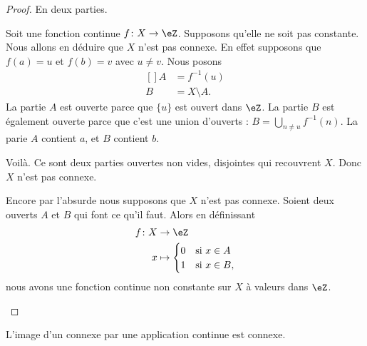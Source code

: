 \begin{proof}
	En deux parties.
	\begin{subproof}
		\spitem[\( \Rightarrow\)]
		Soit une fonction continue \(f \colon X\to \eZ  \). Supposons qu'elle ne soit pas constante. Nous allons en déduire que \( X\) n'est pas connexe. En effet supposons que \( f(a)=u\) et \( f(b)=v\) avec \( u\neq v\). Nous posons
		\begin{equation}
			\begin{aligned}[]
				A & =f^{-1}(u)     \\
				B & =X\setminus A.
			\end{aligned}
		\end{equation}
		La partie \( A\) est ouverte parce que \( \{ u \}\) est ouvert dans \( \eZ\). La partie \( B\) est également ouverte parce que c'est une union d'ouverts :  \( B=\bigcup_{n\neq u}f^{-1}(n)\). La parie \( A\) contient \( a\), et \( B\) contient \( b\).

		Voilà. Ce sont deux parties ouvertes non vides, disjointes qui recouvrent \( X\). Donc \( X\) n'est pas connexe.

		\spitem[\( \Leftarrow\)]
		Encore par l'absurde nous supposons que \( X\) n'est pas connexe. Soient deux ouverts \( A\) et \( B\) qui font ce qu'il faut. Alors en définissant
		\begin{equation}
			\begin{aligned}
				f\colon X & \to \eZ                       \\
				x         & \mapsto \begin{cases}
					                    0 & \text{si } x\in A \\
					                    1 & \text{si }x\in B,
				                    \end{cases}
			\end{aligned}
		\end{equation}
		nous avons une fonction continue non constante sur \( X\) à valeurs dans \( \eZ\).
	\end{subproof}
\end{proof}


\begin{lemma}   \label{LemConncontconn}
	L'image d'un connexe par une application continue est connexe.
\end{lemma}

